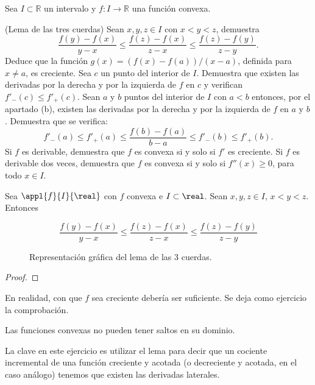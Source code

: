 \begin{problem}[4]



\ex Sea $I\subset \mathbb{R}$ un intervalo y $f:I\to\mathbb{R}$ una función convexa.

\ppart (Lema de las tres cuerdas)  Sean $x,y,z\in I$ con $x<y<z$, demuestra
\[
\frac{f(y)-f(x)}{y-x}\leq \frac{f(z)-f(x)}{z-x}\leq \frac{f(z)-f(y)}{z-y}.
\]
Deduce que la función $g(x)=(f(x)-f(a))/(x-a)$, definida para $x\neq a$, es creciente.
\ppart Sea $c$ un punto del interior de $I$. Demuestra que existen las derivadas por la derecha y por la izquierda de $f$ en $c$ y verifican $f'_-(c)\leq f'_+(c)$.
\ppart Sean $a$ y $b$ puntos del interior de $I$ con $a<b$ entonces, por el apartado (b), existen las derivadas por la derecha y por la izquierda de $f$ en $a$ y $b$. Demuestra que se verifica:
\[
f'_-(a)\leq f'_+(a)\leq \frac{f(b)-f(a)}{b-a} \leq f'_-(b)\leq f'_+(b).
\]
\ppart Si $f$ es derivable, demuestra que $f$ es convexa si y solo si $f'$ es creciente.
\ppart Si $f$ es derivable dos veces, demuestra que $f$ es convexa si y solo si $f''(x)\geq 0$, para todo $x\in I$.


\solution

\begin{lemma}
Sea $\appl{f}{I}{\real}$ con $f$ convexa e $I\subset \real$.
%
Sean $x,y,z \in I$, $x<y<z$.
%
Entonces

\[
\frac{f(y)-f(x)}{y-x} \leq \frac{f(z)-f(x)}{z-x} \leq \frac{f(z)-f(y)}{z-y}
\]
\end{lemma}


\begin{figure}[hbtp]
\centering
{}
\caption{Representación gráfica del lema de las 3 cuerdas.}
\end{figure}

\begin{proof}

\end{proof}

\obs En realidad, con que $f$ sea creciente debería ser suficiente.
%
Se deja como ejercicio la comprobación.

\ppart Las funciones convexas no pueden tener saltos en su dominio.

La clave en este ejercicio es utilizar el lema para decir que un cociente incremental de una función creciente y acotada (o decreciente y acotada, en el caso análogo) tenemos que existen las derivadas laterales.

\end{problem}

